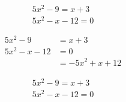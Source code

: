 \documentclass[11pt]{article}
\begin{document}
	\begin{align}
		5x^2-9=x+3\\
		5x^2-x-12=0
	\end{align}
	
	\begin{align*}
		5x^2-9&=x+3\\
		5x^2-x-12&=0\\
		&=-5x^2+x+12
	\end{align*}	
	
	\begin{align}
		5x^2-9=x+3\\
		5x^2-x-12=0
	\end{align}
	
	
\end{document}
